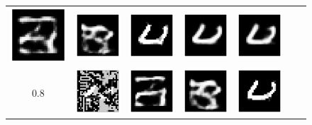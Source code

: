 \begin{figure}[h]
\begin{tabular}{cccc|ccc}
        \includegraphics[width=0.1\linewidth]{pics/3_adv_att/mnist_MCMC/mnist_noMCMC_adv_rec_0_rad_0.6.pdf} &
        \includegraphics[width=0.1\linewidth]{pics/3_adv_att/mnist_MCMC/mnist_noMCMC_adv_rec_t_0_rad_0.6.pdf} &
        \includegraphics[width=0.1\linewidth]{pics/3_adv_att/mnist_MCMC/mnist_MCMC_adv_0_rad_0.6.pdf} &
        \includegraphics[width=0.1\linewidth]{pics/3_adv_att/mnist_MCMC/mnist_MCMC_adv_rec_0_rad_0.6.pdf} &
        \includegraphics[width=0.1\linewidth]{pics/3_adv_att/mnist_MCMC/mnist_MCMC_adv_rec_t_0_rad_0.6.pdf} \\ 
        0.8 & \includegraphics[width=0.1\linewidth]{pics/3_adv_att/mnist_MCMC/mnist_noMCMC_adv_0_rad_0.8.pdf} &
        \includegraphics[width=0.1\linewidth]{pics/3_adv_att/mnist_MCMC/mnist_noMCMC_adv_rec_0_rad_0.8.pdf} &
        \includegraphics[width=0.1\linewidth]{pics/3_adv_att/mnist_MCMC/mnist_noMCMC_adv_rec_t_0_rad_0.8.pdf} &
        \includegraphics[width=0.1\linewidth]{pics/3_adv_att/mnist_MCMC/mnist_MCMC_adv_0_rad_0.8.pdf} &

\end{tabular}
\end{figure}
